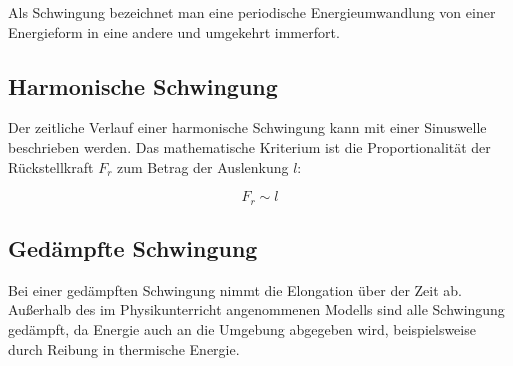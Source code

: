 Als Schwingung bezeichnet man eine periodische Energieumwandlung von einer Energieform in eine andere und umgekehrt immerfort.

\subsection{Harmonische Schwingung} \label{subsec:harmonisch}

Der zeitliche Verlauf einer harmonische Schwingung kann mit einer Sinuswelle beschrieben werden. Das mathematische Kriterium ist die Proportionalität der Rückstellkraft $F_{r}$ zum Betrag der Auslenkung $l$:

\begin{equation} \label{eq:kriterium_harmonisch}
	F_{r} \sim l
\end{equation}


\subsection{Gedämpfte Schwingung}

Bei einer gedämpften Schwingung nimmt die Elongation über der Zeit ab. Außerhalb des im Physikunterricht angenommenen Modells sind alle Schwingung gedämpft, da Energie auch an die Umgebung abgegeben wird, beispielsweise durch Reibung in thermische Energie.

